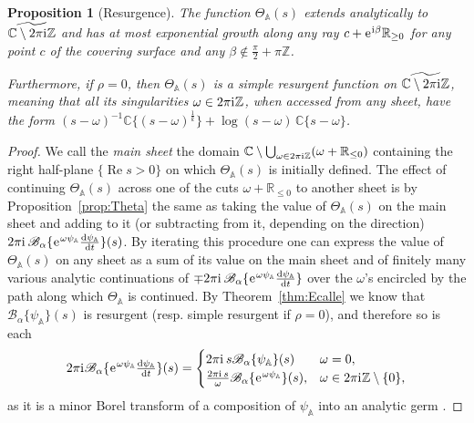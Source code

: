 \documentclass[a4paper,11pt]{amsart}
\numberwithin{equation}{section}
\newcommand{\C}{{\mathbb C}}
\newcommand{\Z}{{\mathbb Z}}
\newcommand{\R}{{\mathbb R}}
\newcommand{\sminus}{\setminus} %
\renewcommand{\Re}{\operatorname{Re}}
\renewcommand{\i}{\mathrm{i}\mkern.25\thinmuskip}
\renewcommand{\d}{\ensuremath{\operatorname{d}\!}}
\newcommand{\e}{\ensuremath{\mkern.25\thinmuskip\mathrm{e}\mkern.4\thinmuskip}}
\newcommand{\orbit}{\mathbb{A}}
\newcommand{\Borel}{\mathscr{B}}
\newtheorem{proposition}[theorem]{Proposition}
\theoremstyle{definition}
\begin{document}
\begin{proposition}[Resurgence]\label{prop:resurgenceofTheta}
The function $\Theta_\orbit(s)$ extends  analytically  to $\widetilde{\C\sminus 2\pi\i\Z}$ and has at most exponential growth along any ray $c+\e^{\i\beta}\R_{\geq 0}$ for any point $c$ of the covering surface and any $\beta\notin \frac{\pi}{2}+\pi\Z$.
	
Furthermore, if  $\rho=0$, then $\Theta_\orbit(s)$ is a simple resurgent function on $\widetilde{\C\sminus 2\pi\i\Z}$, meaning that all its singularities
$\omega\in2\pi\i\Z$, when accessed from any sheet, have the form 
$(s\!-\!\omega)^{-1}\C\{(s\!-\!\omega)^{\frac{1}{k}}\}
+\log(s\!-\!\omega)\,\C\{s\!-\!\omega\}$. 
\end{proposition} 

\begin{proof}
We call the \emph{main sheet} the domain $\C\setminus\bigcup_{\omega\in 2\pi\i\Z}(\omega+\R_{\leq 0})$ containing the right half-plane $\{\Re s>0\}$ on which $\Theta_\orbit(s)$ is initially defined. 
The effect of continuing $\Theta_\orbit(s)$ across one of the cuts $\omega+\R_{\leq 0}$ to another sheet is by Proposition~\ref{prop:Theta} the same as taking the value of $\Theta_\orbit(s)$ on the main sheet and adding to it (or subtracting from it, depending on the direction) $2\pi\i\,\Borel_\alpha\{\e^{\omega\psi_\orbit}\tfrac{\d\psi_\orbit}{\d t}\}(s)$.
By iterating this procedure one can express the value of $\Theta_\orbit(s)$ on any sheet as a sum of its value on the main sheet and of finitely many various analytic continuations of $\mp2\pi\i\,\Borel_{\alpha}\{\e^{\omega\psi_\orbit}\tfrac{\d\psi_\orbit}{\d t}\}$ over the  $\omega$'s encircled by the path along which $\Theta_\orbit$ is continued.
By Theorem~\ref{thm:Ecalle} we know that $\Borel_\alpha\{\psi_\orbit\}(s)$ is resurgent (resp. simple resurgent if $\rho=0$), and therefore so is each
\[2\pi\i\Borel_\alpha\{\e^{\omega\psi_\orbit}\tfrac{\d\psi_\orbit}{\d t}\}(s)=\begin{cases}
2\pi\i\,s\Borel_\alpha\{\psi_\orbit\}(s)&\omega=0,\\
\tfrac{2\pi\i\,s}{\omega}\Borel_\alpha\{\e^{\omega\psi_\orbit}\}(s),&\omega\in2\pi\i\Z\setminus\{0\},
\end{cases}\]
as it is a minor Borel transform of a composition of $\psi_\orbit$ into an analytic germ \cite[Theorem 6.32]{MitschiSauzin}.
\end{proof}
\end{document}
